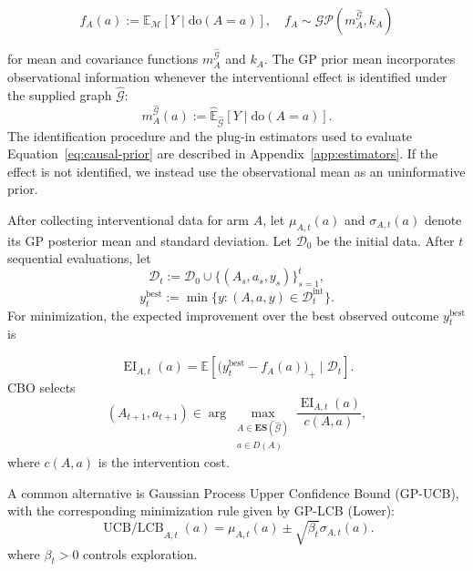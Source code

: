 \documentclass[twoside]{article}
\newcommand{\E}{\mathbb{E}}
\newcommand{\doo}{\mathrm{do}}
\newcommand{\ES}{\mathbf{ES}}
\begin{document}
\begin{equation}
  f_A(a):=\E_{\mathcal M}[Y\mid\doo(A=a)],
  \quad f_A\sim\mathcal{GP}(m_A^{\widehat{\mathcal G}},k_A)
  \label{eq:cbo-gp}
\end{equation}

for mean and covariance functions $m^\widehat{\mathcal G}_A$ and $k_A$. The GP prior mean incorporates observational information whenever the
interventional effect is identified under the supplied graph $\widehat{\mathcal G}$:
\begin{equation}
  m_A^{\widehat{\mathcal G}}(a)
  :=
  \widehat{\E}_{\widehat{\mathcal G}}\!\left[Y\mid\doo(A=a)\right].
  \label{eq:causal-prior}
\end{equation}
The identification procedure and the plug-in estimators used to evaluate Equation~\eqref{eq:causal-prior} are described in Appendix~\ref{app:estimators}. If the effect is not identified, we instead use the observational mean as an uninformative prior.

After collecting interventional data for arm $A$, let $\mu_{A,t}(a)$ and $\sigma_{A,t}(a)$ denote its GP posterior mean and standard deviation. Let $\mathcal D_0$ be the initial data. After $t$ sequential evaluations, let
\[
\mathcal D_t
:=
\mathcal D_0
\cup
\{(A_s,a_s,y_s)\}_{s=1}^{t},
\]
\[
y_t^{\mathrm{best}}
:=
\min\{y:(A,a,y)\in\mathcal D_t^{\mathrm{int}}\}.
\]
For minimization, the expected improvement over the
best observed outcome $y_t^{\mathrm{best}}$ is

\begin{equation}
  \operatorname{EI}_{A,t}(a)
  =
  \E\!\left[
    \bigl(y_t^{\mathrm{best}}-f_A(a)\bigr)_+
    \mid\mathcal D_t
  \right].
  \label{eq:ei}
\end{equation}
CBO selects
\begin{equation}
  (A_{t+1},a_{t+1})
  \in
  \arg\max_{\substack{A\in\ES({\widehat{\mathcal G}})\\a\in D(A)}}
  \frac{\operatorname{EI}_{A,t}(a)}{c(A,a)},
  \label{eq:cost-ei}
\end{equation}
where $c(A,a)$ is the intervention cost.

A common alternative is Gaussian Process Upper Confidence Bound (GP-UCB), with the corresponding minimization rule
given by GP-LCB (Lower):
\begin{equation}
  \operatorname{UCB/LCB}_{A,t}(a)
  =
  \mu_{A,t}(a)
  \pm
  \sqrt{\beta_t}\sigma_{A,t}(a).
  \label{eq:confidence-bounds}
\end{equation}
where $\beta_t>0$ controls exploration.
\end{document}

